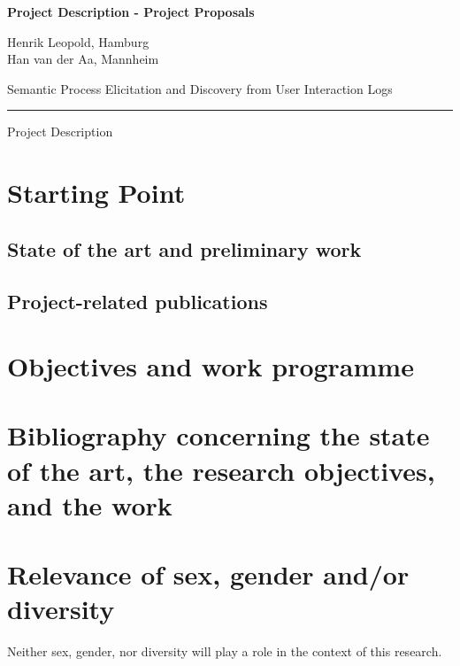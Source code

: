 \documentclass{scrartcl}
\newcommand\todo[1]{\textcolor{red}{#1}}
\newcommand{\applicants}{\normalfont  Henrik Leopold, Hamburg \\ Han van der Aa, Mannheim \bfseries}
\newcommand{\project}{Semantic Process Elicitation and Discovery from User Interaction Logs}
\begin{document}

{\raggedright{} \normalsize \bfseries 
	Project Description - Project Proposals \par 
	\applicants{} \par
	\project{} \par
	\rule{\textwidth}{0.5pt} \par
	Project Description
}

\newenvironment{nscenter}
 {\parskip=3pt\par\nopagebreak\centering}
 {\par\noindent\ignorespacesafterend}
 
 \vspace{-1em}
\section{Starting Point}


\subsection{State of the art and preliminary work}


\subsection{Project-related publications}


\section{Objectives and work programme}


\section{Bibliography concerning the state of the art, the research objectives, and the work}
\printbibliography[heading=none]


\vspace{-1em}
\section{Relevance of sex, gender and/or diversity}
\vspace{-1em}
Neither sex, gender, nor diversity will play a role in the context of this research. 
\pagebreak
\end{document}
